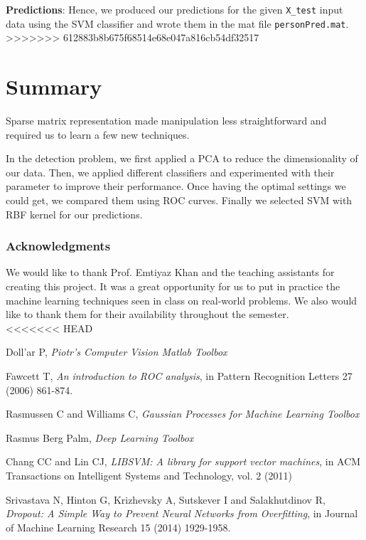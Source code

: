 \documentclass{article}
\begin{document}
  \textbf{Predictions}: Hence, we produced our predictions for the given \texttt{X\_test} input data using the SVM classifier and wrote them in the mat file \texttt{personPred.mat}.
>>>>>>> 612883b8b675f68514e68e047a816cb54df32517

\section{Summary}
  Sparse matrix representation made manipulation less straightforward and required us to learn a few new techniques.

  In the detection problem, we first applied a PCA to reduce the dimensionality of our data. Then, we applied different classifiers and experimented with their parameter to improve their performance. Once having the optimal settings we could get, we compared them using ROC curves. Finally we selected SVM with RBF kernel for our predictions.

  \subsubsection*{Acknowledgments}
  	We would like to thank Prof. Emtiyaz Khan and the teaching assistants for creating this project. It was a great opportunity for us to put in practice the machine learning techniques seen in class on real-world problems. We also would like to thank them for their availability throughout the semester.\\
<<<<<<< HEAD
  
     \begin{thebibliography}{99}
   
   	 Doll'ar P, \textit{Piotr's Computer Vision Matlab Toolbox}
	
	 Fawcett T, \textit{An introduction to ROC analysis}, in Pattern Recognition Letters 27 (2006) 861-874.
	   
     	 Rasmussen C and Williams C, \textit{Gaussian Processes for Machine Learning Toolbox}
	
	 Rasmus Berg Palm, \textit{Deep Learning Toolbox}
		
	 Chang CC and Lin CJ, \textit{LIBSVM: A library for support vector machines}, in ACM Transactions on Intelligent Systems and Technology, vol. 2 (2011)
		
	 Srivastava N, Hinton G, Krizhevsky A, Sutskever I and Salakhutdinov R, \textit{Dropout: A Simple Way to Prevent Neural Networks from Overfitting}, in Journal of Machine Learning Research 15 (2014) 1929-1958.

   \end{thebibliography}
   
\end{document}
